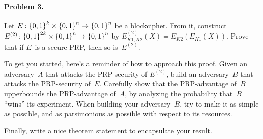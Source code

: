 \documentclass[11pt]{article}
\begin{document}

\paragraph{Problem 3.}
Let $E:{\{0,1\}}^k \times {\{0,1\}}^n \to {\{0,1\}}^n$ be a blockcipher.  From it,
construct $E^{(2)}\colon {\{0,1\}}^{2k} \times {\{0,1\}}^n \to {\{0,1\}}^n$ by
$E^{(2)}_{K1,K2}(X) = E_{K2}(E_{K1}(X))$. Prove that if $E$~is a
secure PRP, then so is~$E^{(2)}$.  

To get you started, here's a reminder of how to approach this
proof. Given an adversary~$A$ that attacks the PRP-security of
$E^{(2)}$, build an adversary~$B$ that attacks the PRP-security
of~$E$.  Carefully show that the PRP-advantage of~$B$ upperbounds the
PRP-advantage of~$A$, by analyzing the probability that~$B$ ``wins''
its experiment.  When building your adversary~$B$, try to make it as
simple as possible, and as parsimonious as possible with respect to
its resources.  

Finally, write a nice theorem statement to encapsulate
your result. 

\vspace{1cm}
\end{document}
